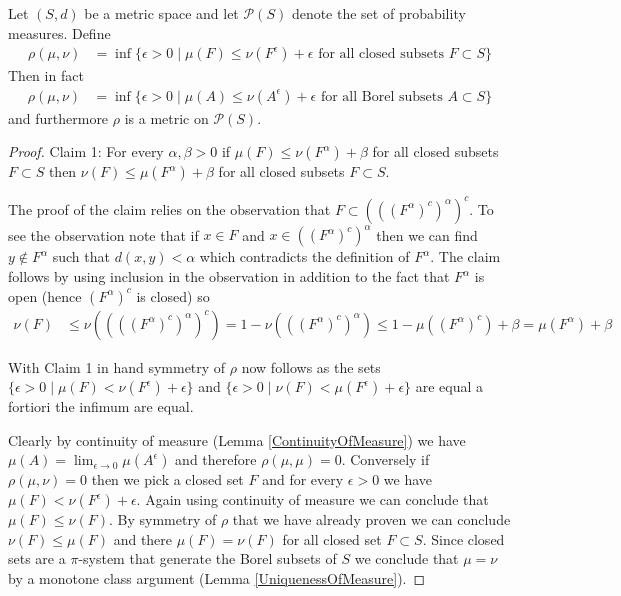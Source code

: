 \begin{lem}\label{LevyProhorovMetric}Let $(S,d)$ be a metric space and let $\mathcal{P}(S)$
  denote the set of probability measures.  Define 
\begin{align*}
\rho(\mu, \nu) &= \inf \lbrace \epsilon > 0 \mid \mu(F) \leq
\nu(F^\epsilon) + \epsilon \text{ for all closed subsets } F \subset S \rbrace
\end{align*}
Then in fact 
\begin{align*}
\rho(\mu, \nu) &= \inf \lbrace \epsilon > 0 \mid \mu(A) \leq
\nu(A^\epsilon) + \epsilon \text{ for all Borel  subsets } A \subset S \rbrace
\end{align*}
and furthermore $\rho$ is a metric on $\mathcal{P}(S)$.
\end{lem}
\begin{proof}
Claim 1: For every $\alpha, \beta > 0$ if $\mu(F) \leq \nu(F^\alpha) +
\beta$ for all closed subsets $F \subset S$ then $\nu(F) \leq \mu(F^\alpha) +
\beta$ for all closed subsets $F \subset S$.

The proof of the claim relies on the observation that $F \subset
(((F^\alpha)^c)^\alpha)^c$.
To see the observation note that if $x \in F$ and $x \in
((F^\alpha)^c)^\alpha$ then we can find $y \notin F^\alpha$ such that
$d(x, y)  < \alpha$ which contradicts the definition of $F^\alpha$.
The claim follows by using inclusion in the observation in addition to
the fact that $F^\alpha$ is open (hence
$(F^\alpha)^c$ is closed) so
\begin{align*}
\nu(F) &\leq \nu((((F^\alpha)^c)^\alpha)^c) = 1 -
\nu(((F^\alpha)^c)^\alpha) \leq 1 - \mu((F^\alpha)^c) + \beta =
\mu(F^\alpha) + \beta
\end{align*}

With Claim 1 in hand symmetry of $\rho$ now follows as the sets
$\lbrace \epsilon > 0 \mid \mu(F) < \nu(F^\epsilon) + \epsilon 
\rbrace$ and $\lbrace \epsilon > 0 \mid \nu(F) < \mu(F^\epsilon) + \epsilon
\rbrace$ are equal a fortiori the infimum are equal.

Clearly by continuity of measure (Lemma \ref{ContinuityOfMeasure}) we
have $\mu(A) = \lim_{\epsilon \to 0} \mu(A^\epsilon)$ and therefore
$\rho(\mu, \mu) = 0$.  Conversely if $\rho(\mu, \nu) = 0$ then we pick
a closed set $F$ and for every $\epsilon > 0$ we have $\mu(F) <
\nu(F^\epsilon) + \epsilon$.  Again using continuity of measure we can
conclude that $\mu(F) \leq \nu(F)$.  By symmetry of $\rho$ that we
have already proven we can conclude $\nu(F) \leq \mu(F)$ and there
$\mu(F) = \nu(F)$ for all closed set $F \subset S$.  Since closed sets
are a $\pi$-system that generate the Borel subsets of $S$ we conclude
that $\mu = \nu$ by a monotone class argument (Lemma
\ref{UniquenessOfMeasure}).


\end{proof}
